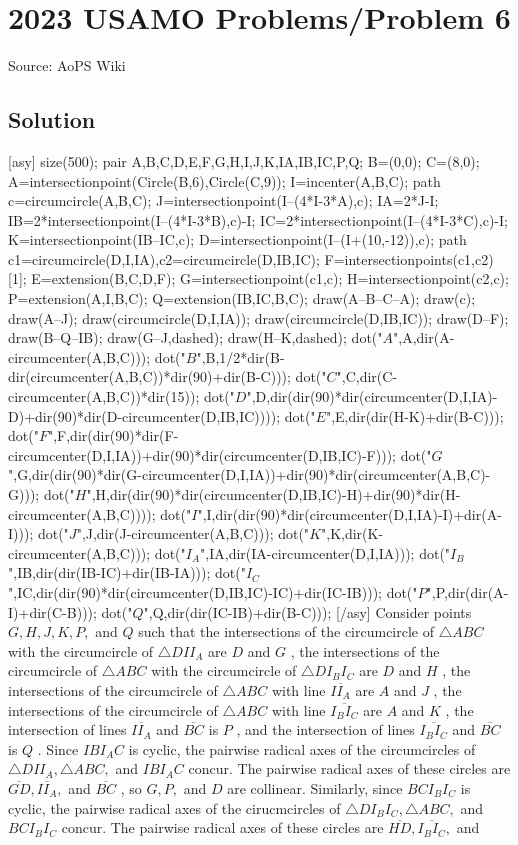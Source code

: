 \documentclass[12pt]{article}
\begin{document}
\section*{{2023 USAMO Problems/Problem 6}}
Source: AoPS Wiki

\subsection*{Solution}
[asy] size(500); pair A,B,C,D,E,F,G,H,I,J,K,IA,IB,IC,P,Q; B=(0,0); C=(8,0); A=intersectionpoint(Circle(B,6),Circle(C,9)); I=incenter(A,B,C); path c=circumcircle(A,B,C); J=intersectionpoint(I--(4*I-3*A),c); IA=2*J-I; IB=2*intersectionpoint(I--(4*I-3*B),c)-I; IC=2*intersectionpoint(I--(4*I-3*C),c)-I; K=intersectionpoint(IB--IC,c); D=intersectionpoint(I--(I+(10,-12)),c); path c1=circumcircle(D,I,IA),c2=circumcircle(D,IB,IC); F=intersectionpoints(c1,c2)[1]; E=extension(B,C,D,F); G=intersectionpoint(c1,c); H=intersectionpoint(c2,c); P=extension(A,I,B,C); Q=extension(IB,IC,B,C); draw(A--B--C--A); draw(c); draw(A--J); draw(circumcircle(D,I,IA)); draw(circumcircle(D,IB,IC)); draw(D--F); draw(B--Q--IB); draw(G--J,dashed); draw(H--K,dashed); dot("$A$",A,dir(A-circumcenter(A,B,C))); dot("$B$",B,1/2*dir(B-dir(circumcenter(A,B,C))*dir(90)+dir(B-C))); dot("$C$",C,dir(C-circumcenter(A,B,C))*dir(15)); dot("$D$",D,dir(dir(90)*dir(circumcenter(D,I,IA)-D)+dir(90)*dir(D-circumcenter(D,IB,IC)))); dot("$E$",E,dir(dir(H-K)+dir(B-C))); dot("$F$",F,dir(dir(90)*dir(F-circumcenter(D,I,IA))+dir(90)*dir(circumcenter(D,IB,IC)-F))); dot("$G$",G,dir(dir(90)*dir(G-circumcenter(D,I,IA))+dir(90)*dir(circumcenter(A,B,C)-G))); dot("$H$",H,dir(dir(90)*dir(circumcenter(D,IB,IC)-H)+dir(90)*dir(H-circumcenter(A,B,C)))); dot("$I$",I,dir(dir(90)*dir(circumcenter(D,I,IA)-I)+dir(A-I))); dot("$J$",J,dir(J-circumcenter(A,B,C))); dot("$K$",K,dir(K-circumcenter(A,B,C))); dot("$I_A$",IA,dir(IA-circumcenter(D,I,IA))); dot("$I_B$",IB,dir(dir(IB-IC)+dir(IB-IA))); dot("$I_C$",IC,dir(dir(90)*dir(circumcenter(D,IB,IC)-IC)+dir(IC-IB))); dot("$P$",P,dir(dir(A-I)+dir(C-B))); dot("$Q$",Q,dir(dir(IC-IB)+dir(B-C))); [/asy] Consider points $G,H,J,K,P,$ and $Q$ such that the intersections of the circumcircle of $\triangle{}ABC$ with the circumcircle of $\triangle{}DII_A$ are $D$ and $G$ , the intersections of the circumcircle of $\triangle{}ABC$ with the circumcircle of $\triangle{}DI_BI_C$ are $D$ and $H$ , the intersections of the circumcircle of $\triangle{}ABC$ with line $\overline{II_A}$ are $A$ and $J$ , the intersections of the circumcircle of $\triangle{}ABC$ with line $\overline{I_BI_C}$ are $A$ and $K$ , the intersection of lines $\overline{II_A}$ and $\overline{BC}$ is $P$ , and the intersection of lines $\overline{I_BI_C}$ and $\overline{BC}$ is $Q$ . Since $IBI_AC$ is cyclic, the pairwise radical axes of the circumcircles of $\triangle{}DII_A,\triangle{}ABC,$ and $IBI_AC$ concur. The pairwise radical axes of these circles are $\overline{GD},\overline{II_A},$ and $\overline{BC}$ , so $G,P,$ and $D$ are collinear. Similarly, since $BCI_BI_C$ is cyclic, the pairwise radical axes of the cirucmcircles of $\triangle{}DI_BI_C,\triangle{}ABC,$ and $BCI_BI_C$ concur. The pairwise radical axes of these circles are $\overline{HD},\overline{I_BI_C},$ and 
\end{document}
